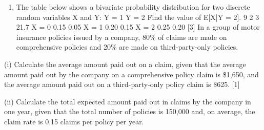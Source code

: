 \documentclass[a4paper,12pt]{article}
\begin{document}
\begin{enumerate}
\item The table below shows a bivariate probability distribution for two discrete random variables X and Y:
Y = 1
Y = 2
Find the value of E[X|Y = 2].
9
2
3
21.7
X = 0
0.15
0.05
X = 1
0.20
0.15
X = 2
0.25
0.20
[3]
In a group of motor insurance policies issued by a company, 80\% of claims are made on comprehensive policies and 20\% are made on third-party-only policies.
\end{enumerate}
\item (i) Calculate the average amount paid out on a claim, given that the average amount paid out by the company on a comprehensive policy claim is \$1,650, and the average amount paid out on a third-party-only policy claim is \$625.
[1]
\item (ii) Calculate the total expected amount paid out in claims by the company in one year, given that the total number of policies is 150,000 and, on average, the claim rate is 0.15 claims per policy per year.
\end{document}
